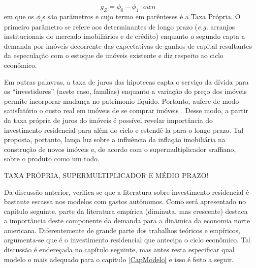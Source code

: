\begin{equation}
g_Z = \phi_0 - \phi_1\cdot own
\end{equation}
em que os $\phi_i$s são parâmetros e cujo termo em parênteses é a Taxa Própria. 
O primeiro parâmetro se refere aos determinantes de longo prazo (\textit{e.g.} arranjos institucionais do mercado imobiliários e de crédito) enquanto o segundo capta a demanda por imóveis decorrente das expectativas de ganhos de capital resultantes da especulação com o estoque de imóveis existente e diz respeito ao ciclo econômico.

Em outras palavras, a taxa de juros das hipotecas capta o serviço da dívida para os ``investidores'' (neste caso, famílias) enquanto a variação do preço dos imóveis permite incorporar mudança no patrimonio líquido. Portanto, aufere de modo satisfatório o custo real em imóveis de se comprar imóveis \cite[p.~53]{teixeira_crescimento_2015}. Desse modo, a partir da taxa própria de juros do imóveis é possível revelar importância do investimento residencial para além do ciclo e estendê-la para o longo prazo.  Tal proposta, portanto, lança luz sobre a influência da inflação imobiliária na construção de novos imóveis e, de acordo com o supermultiplicador sraffiano, sobre o produto como um todo. 


TAXA PRÓPRIA, SUPERMULTIPLICADOR E MÉDIO PRAZO!

Da discussão anterior, verifica-se que a literatura sobre investimento residencial é bastante escassa nos modelos com gastos autônomos. Como será apresentado no capítulo seguinte, parte da literatura empírica (diminuta, mas crescente) destaca a importância deste componente da demanda para a dinâmica da economia norte americana. Diferentemente de grande parte dos trabalhos teóricos e empíricos, argumenta-se que é o investimento residencial que antecipa o ciclo econômico. Tal discussão é endereçada no capítulo seguinte, mas antes resta especificar qual modelo o mais adequado para o capítulo \ref{CapModelo} e isso é feito a seguir.
